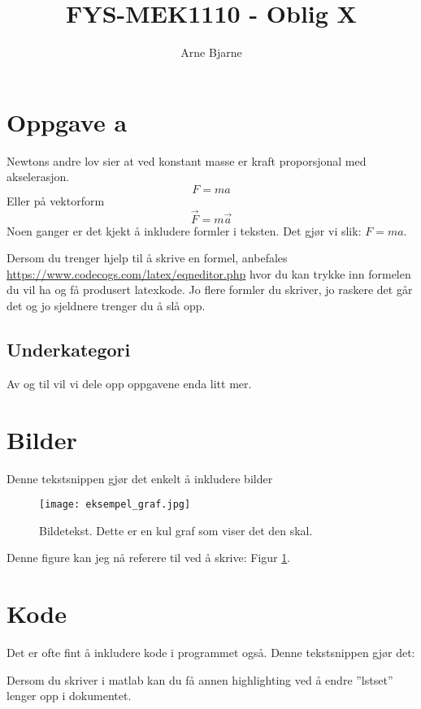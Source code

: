 \documentclass[a4paper,10pt,english]{article}
\title{FYS-MEK1110 - Oblig X}
\author{Arne Bjarne}
\begin{document}
\maketitle

\section{Oppgave a}

Newtons andre lov sier at ved konstant masse er kraft proporsjonal med akselerasjon. 
\[ F = ma \]
Eller på vektorform
\[ \vec F = m \vec a \]
Noen ganger er det kjekt å inkludere formler i teksten. 
Det gjør vi slik: $F = ma$. 

Dersom du trenger hjelp til å skrive en formel, anbefales \url{https://www.codecogs.com/latex/eqneditor.php} hvor du kan trykke inn formelen du vil ha og få produsert latexkode. 
Jo flere formler du skriver, jo raskere det går det og jo sjeldnere trenger du å slå opp. 

\subsection{Underkategori}

Av og til vil vi dele opp oppgavene enda litt mer. 


\section{Bilder}

Denne tekstsnippen gjør det enkelt å inkludere bilder 

\begin{figure}[h!]
        \centering 
        \texttt{[image: eksempel\_graf.jpg]} 
        \caption{Bildetekst. Dette er en kul graf som viser det den skal.}
        \label{fig:eksempelbilde1}
\end{figure}

Denne figure kan jeg nå referere til ved å skrive: Figur \ref{fig:eksempelbilde1}. 


\section{Kode}

Det er ofte fint å inkludere kode i programmet også. 
Denne tekstsnippen gjør det:



Dersom du skriver i matlab kan du få annen highlighting ved å endre ''lstset'' lenger opp i dokumentet. 
\end{document}
